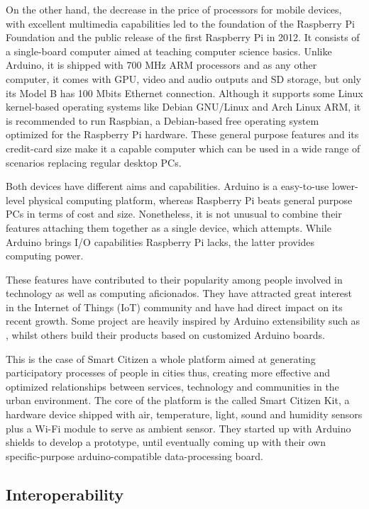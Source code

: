On the other hand, the decrease in the price of processors for mobile devices, with excellent multimedia capabilities led to the foundation of the Raspberry Pi Foundation and the public release of the first Raspberry Pi in 2012. It consists of a single-board computer aimed at teaching computer science basics. Unlike Arduino, it is shipped with 700 MHz ARM processors and as any other computer, it comes with GPU, video and audio outputs and SD storage, but only its Model B has 100 Mbits Ethernet connection. Although it supports some Linux kernel-based operating systems like Debian GNU/Linux and Arch Linux ARM, it is recommended to run Raspbian, a Debian-based free operating system optimized for the Raspberry Pi hardware. These general purpose features and its credit-card size make it a capable computer which can be used in a wide range of scenarios replacing regular desktop PCs.

Both devices have different aims and capabilities. Arduino is a easy-to-use lower-level physical computing platform, whereas Raspberry Pi beats general purpose PCs in terms of cost and size. Nonetheless, it is not unusual to combine their features attaching them together as a single device, which \cite{Arduberry} attempts. While Arduino brings I/O capabilities Raspberry Pi lacks, the latter provides computing power.

These features have contributed to their popularity among people involved in technology as well as computing aficionados. They have attracted great interest in the Internet of Things (IoT) community and have had direct impact on its recent growth. Some project are heavily inspired by Arduino extensibility such as \cite{Thinking-Things}, whilst others build their products based on customized Arduino boards.

This is the case of Smart Citizen a whole platform aimed at generating participatory processes of people in cities thus, creating more effective and optimized relationships between services, technology and communities in the urban environment. The core of the platform is the called Smart Citizen Kit, a hardware device shipped with air, temperature, light, sound and humidity sensors plus a Wi-Fi module to serve as ambient sensor. They started up with Arduino shields to develop a prototype, until eventually coming up with their own specific-purpose arduino-compatible data-processing board.

\subsection{Interoperability}

